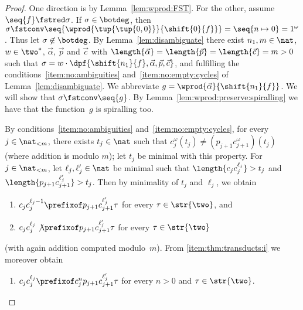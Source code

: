 \begin{proof}
  One direction is by Lemma~\ref{lem:wprod:FST}.
  For the other, assume $\seq{f} \fstred \sigma$.
  If $\sigma \in \botdeg$, then $\sigma \fstconv \seq{\wprod{\tup{\tup{0,0}}}{\shift{0}{f}}} = \seq{n \mapsto 0} = 1^\omega$.
  Thus let $\sigma \not\in \botdeg$.
  By Lemma~\ref{lem:disambiguate} there exist
  $n_1, m \in \nat$, $w \in \two^*$, $\vec{\alpha}$, $\vec{p}$ and $\vec{c}$ 
  with $\length{\vec{\alpha}} = \length{\vec{p}} = \length{\vec{c}} = m > 0$
  such that $\sigma = w \cdot \dpf{\shift{n_1}{f},\vec{\alpha},\vec{p},\vec{c}}$, and
  fulfilling the conditions~\ref{item:no:ambiguities} and~\ref{item:no:empty:cycles} 
  of Lemma~\ref{lem:disambiguate}.
  We abbreviate $g = \wprod{\vec{\alpha}}{\shift{n_1}{f}}$.
  We will show that $\sigma \fstconv \seq{g}$.
By Lemma~\ref{lem:wprod:preserve:spiralling}
  we have that the function~$g$ is spiralling too.
  
By conditions~\ref{item:no:ambiguities} and~\ref{item:no:empty:cycles},
  for every $j \in \nat_{<m}$,
  there exists $t_j \in \nat$ such that $c_j^\omega(t_j) \ne (p_{j+1}c_{j+1}^\omega)(t_j)$ 
  (where addition is modulo $m$);
  let $t_j$ be minimal with this property.
For $j \in \nat_{<m}$, let $\ell_j,\ell_j' \in \nat$ be minimal such that $\length{c_j c_j^{\ell_j}} > t_j$
  and $\length{p_{j+1} c_{j+1}^{\ell_j'}} > t_j$.
  Then by minimality of $t_j$ and $\ell_j$, we obtain
  \begin{enumerate}
    \item \label{item:thm:transducts:i}
      $c_j c_j^{\ell_j-1} \prefixof p_{j+1} c_{j+1}^{\ell'_j} \tau$ for every $\tau \in \str{\two}$, and
    \item 
      $c_j c_j^{\ell_j} \not\prefixof p_{j+1} c_{j+1}^{\ell'_j} \tau$ for every $\tau \in \str{\two}$
  \end{enumerate}
  (with again addition computed modulo~$m$).
  From \ref{item:thm:transducts:i} we moreover obtain
  \begin{enumerate}[resume]
    \item \label{item:thm:transducts:iii}
      $c_j c_j^{\ell_j} \prefixof c_j^{n} p_{j+1} c_{j+1}^{\ell'_j} \tau$ for every $n > 0$ and $\tau \in \str{\two}$.
  \end{enumerate}


\end{proof}

